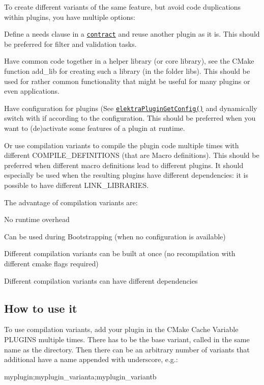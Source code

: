 To create different variants of the same feature, but avoid code duplications within plugins, you have multiple options\+:
\begin{DoxyItemize}
\item Define a needs clause in a \href{/home/markus/Projekte/Elektra/current/doc/CONTRACT.ini}{\tt contract} and reuse another plugin as it is. This should be preferred for filter and validation tasks.
\item Have common code together in a helper library (or core library), see the C\+Make function add\+\_\+lib for creating such a library (in the folder libs). This should be used for rather common functionality that might be useful for many plugins or even applications.
\item Have configuration for plugins (See \href{http://doc.libelektra.org/api/latest/html/group__plugin.html}{\tt elektra\+Plugin\+Get\+Config()} and dynamically switch with if according to the configuration. This should be preferred when you want to (de)activate some features of a plugin at runtime.
\item Or use compilation variants to compile the plugin code multiple times with different {\ttfamily C\+O\+M\+P\+I\+L\+E\+\_\+\+D\+E\+F\+I\+N\+I\+T\+I\+O\+N\+S} (that are Macro definitions). This should be preferred when different macro definitions lead to different plugins. It should especially be used when the resulting plugins have different dependencies\+: it is possible to have different {\ttfamily L\+I\+N\+K\+\_\+\+L\+I\+B\+R\+A\+R\+I\+E\+S}.
\end{DoxyItemize}

The advantage of compilation variants are\+:
\begin{DoxyItemize}
\item No runtime overhead
\item Can be used during Bootstrapping (when no configuration is available)
\item Different compilation variants can be built at once (no recompilation with different cmake flags required)
\item Different compilation variants can have different dependencies
\end{DoxyItemize}

\subsection*{How to use it}

To use compilation variants, add your plugin in the C\+Make Cache Variable P\+L\+U\+G\+I\+N\+S multiple times. There has to be the base variant, called in the same name as the directory. Then there can be an arbitrary number of variants that additional have a name appended with underscore, e.\+g.\+: \begin{DoxyVerb}    myplugin;myplugin_varianta;myplugin_variantb
\end{DoxyVerb}


